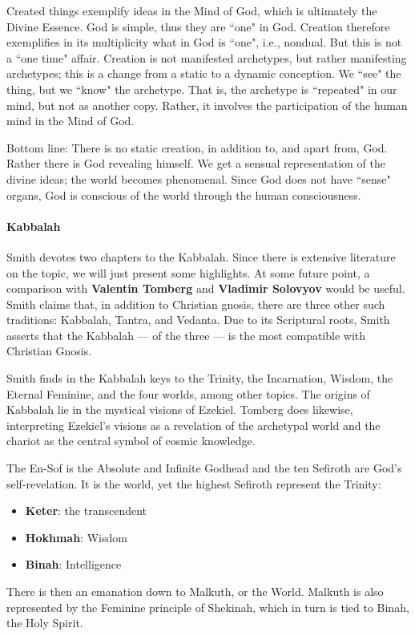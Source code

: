 Created things exemplify ideas in the Mind of God, which is ultimately the Divine Essence. God is simple, thus they are ``one" in God. Creation therefore exemplifies in its multiplicity what in God is ``one", i.e., nondual. But this is not a ``one time" affair. Creation is not manifested archetypes, but rather manifesting archetypes; this is a change from a static to a dynamic conception. We ``see" the thing, but we ``know" the archetype. That is, the archetype is ``repeated" in our mind, but not as another copy. Rather, it involves the participation of the human mind in the Mind of God.

Bottom line: There is no static creation, in addition to, and apart from, God. Rather there is God revealing himself. We get a sensual representation of the divine ideas; the world becomes phenomenal. Since God does not have ``sense" organs, God is conscious of the world through the human consciousness.

\paragraph{Kabbalah}
Smith devotes two chapters to the Kabbalah. Since there is extensive literature on the topic, we will just present some highlights. At some future point, a comparison with \textbf{Valentin Tomberg} and \textbf{Vladimir Solovyov} would be useful. Smith claims that, in addition to Christian gnosis, there are three other such traditions: Kabbalah, Tantra, and Vedanta. Due to its Scriptural roots, Smith asserts that the Kabbalah — of the three — is the most compatible with Christian Gnosis.

Smith finds in the Kabbalah keys to the Trinity, the Incarnation, Wisdom, the Eternal Feminine, and the four worlds, among other topics. The origins of Kabbalah lie in the mystical visions of Ezekiel. Tomberg does likewise, interpreting Ezekiel's visions as a revelation of the archetypal world and the chariot as the central symbol of cosmic knowledge.

The En-Sof is the Absolute and Infinite Godhead and the ten Sefiroth are God's self-revelation. It is the world, yet the highest Sefiroth represent the Trinity:

\begin{itemize}
\item \textbf{Keter}: the transcendent 
\item \textbf{Hokhmah}: Wisdom 
\item \textbf{Binah}: Intelligence 
\end{itemize}
There is then an emanation down to Malkuth, or the World. Malkuth is also represented by the Feminine principle of Shekinah, which in turn is tied to Binah, the Holy Spirit.

